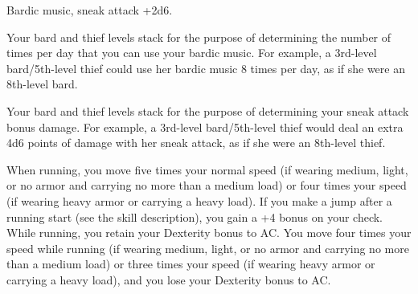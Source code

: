 
{Bardic music, sneak attack +2d6.}
{
Your bard and thief levels stack for the purpose of determining the number of times per day that you can use your bardic music. For example, a 3rd-level bard/5th-level thief could use her bardic music 8 times per day, as if she were an 8th-level bard.

Your bard and thief levels stack for the purpose of determining your sneak attack bonus damage. For example, a 3rd-level bard/5th-level thief would deal an extra 4d6 points of damage with her sneak attack, as if she were an 8th-level thief.
}

{}{}
{When running, you move five times your normal speed (if wearing medium, light, or no armor and carrying no more than a medium load) or four times your speed (if wearing heavy armor or carrying a heavy load). If you make a jump after a running start (see the  skill description), you gain a +4 bonus on your  check. While running, you retain your Dexterity bonus to AC.}
{You move four times your speed while running (if wearing medium, light, or no armor and carrying no more than a medium load) or three times your speed (if wearing heavy armor or carrying a heavy load), and you lose your Dexterity bonus to AC.}{}






